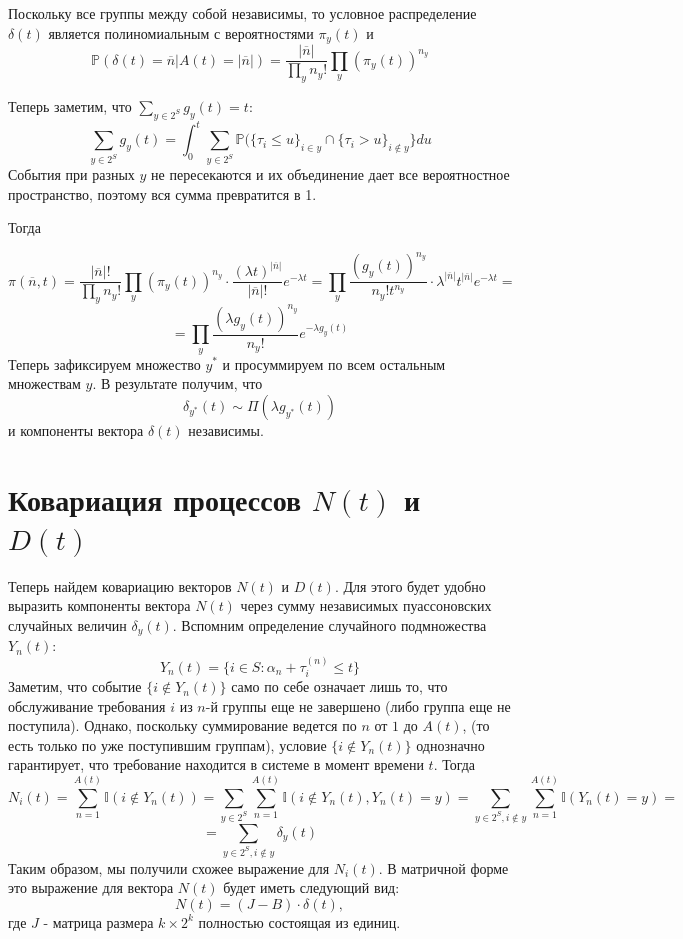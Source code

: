 \documentclass[12pt]{article}
\theoremstyle{plain}
\theoremstyle{definition}
\theoremstyle{remark}
\begin{document}
Поскольку все группы между собой независимы, то условное распределение $\delta(t)$ является полиномиальным с вероятностями $\pi_y(t)$ и 
\[
    \mathbb{P}(\delta(t) = \overline{n}| A(t) = |\overline{n}|) = \frac{|\overline{n}|}{\prod_y n_y!}\prod_y(\pi_y(t))^{n_y}
\]

Теперь заметим, что $\sum_{y\in 2^S}g_y(t) = t$:
\[
    \sum_{y\in 2^S}g_y(t) = \int_0^t \sum_{y \in 2^S}\mathbb{P}(\{\tau_i \le u\}_{i \in y} \cap \{\tau_i > u\}_{i \not\in y}\} du
\]
События при разных $y$ не пересекаются и их объединение дает все вероятностное пространство, поэтому вся сумма превратится в 1.

Тогда

\[
    \pi(\overline{n}, t) = \frac{|\overline{n}|!}{\prod_y n_y!}\prod_y(\pi_y(t))^{n_y} \cdot \frac{(\lambda t)^{|\overline{n}|}}{|\overline{n}|!}e^{-\lambda t} = \prod_y \frac{(g_y(t))^{n_y}}{n_y!t^{n_y}} \cdot \lambda^{|\overline{n}|} t^{|\overline{n}|} e^{-\lambda t} = 
\]
\[
    = \prod_y \frac{(\lambda g_y(t))^{n_y}}{n_y!}e^{-\lambda g_y(t)}
\]
Теперь зафиксируем множество $y^*$ и просуммируем по всем остальным множествам $y$. В результате получим, что
\[
    \delta_{y^*}(t) \sim \Pi(\lambda g_{y^*}(t))
\]
и компоненты вектора $\delta(t)$ независимы.

\section{Ковариация процессов $N(t)$ и $D(t)$}

Теперь найдем ковариацию векторов $N(t)$ и $D(t)$. Для этого будет удобно выразить компоненты вектора $N(t)$ через сумму независимых пуассоновских случайных величин $\delta_y(t)$. Вспомним определение случайного подмножества $Y_n(t)$:
\[
    Y_n(t) = \{i \in S: \alpha_n + \tau_i^{(n)} \le t\}
\]
Заметим, что событие $\{i \not \in Y_n(t)\}$ само по себе означает лишь то, что обслуживание требования $i$ из $n$-й группы еще не завершено (либо группа еще не поступила). Однако, поскольку суммирование ведется по $n$ от $1$ до $A(t)$, (то есть только по уже поступившим группам), условие $\{i \not \in Y_n(t)\}$ однозначно гарантирует, что требование находится в системе в момент времени $t$. Тогда 
\[
    N_i(t) = \sum_{n=1}^{A(t)} \mathbb{I}(i \not \in Y_n(t)) = \sum_{y \in 2^S} \sum_{n=1}^{A(t)}\mathbb{I}(i \not \in Y_n(t), Y_n(t) = y) = \sum_{y \in 2^S, i \not \in y}\sum_{n = 1}^{A(t)}\mathbb{I}(Y_n(t) = y) =
\]
\[
    =  \sum_{y \in 2^S, i \not \in y} \delta_y(t)
\]
Таким образом, мы получили схожее выражение для $N_i(t)$. В матричной форме это выражение для вектора $N(t)$ будет иметь следующий вид:
\[
    N(t) = (J - B)\cdot\delta(t),
\]
где $J$ - матрица размера $k \times 2^k$ полностью состоящая из единиц.
\end{document}

